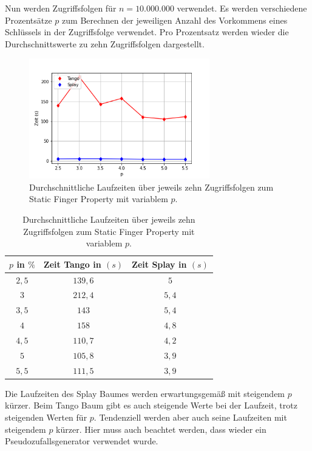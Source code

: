 \documentclass[a4paper,12pt]{article}
\begin{document}
\noindent Nun werden Zugriffsfolgen für $n = 10.000.000$ verwendet. Es werden verschiedene Prozentsätze $p$ zum Berechnen der jeweiligen Anzahl des Vorkommens eines Schlüssels in der Zugriffsfolge verwendet. Pro Prozentsatz werden wieder die Durchschnittswerte zu zehn Zugriffsfolgen dargestellt. 
\begin{figure}[H]
	\centering
	\includegraphics[width=0.7\textwidth]{Medien/laufzeittest/diagramm/staticfinger4}
	\caption{Durchschnittliche Laufzeiten über jeweils zehn Zugriffsfolgen zum Static Finger Property mit variablem $p$.}
\end{figure}
\begin{table}[H]
	\begin{center}
		\begin{tabular}[c]{|c|c|c|}
			\hline
			$p$ in $\%$ & Zeit Tango in $\left(s\right)$ &Zeit Splay in $\left(s\right)$ \\
			\hline
			$2,5$  & $139,6$ &$5$  \\
			\hline
			$3$  &   $212,4$ &  $5,4$  \\
			\hline
			$3,5$  & $143$ &$5,4$  \\
			\hline
			$4$ &    $158$ &$4,8$ \\
			\hline
			$4,5$  & $110,7$ &$4,2$  \\
			\hline
			$5$  &   $105,8$ &  $3,9$  \\
			\hline
			$5,5$  & $111,5$ &$3,9$  \\
			\hline
		\end{tabular}
		\caption{Durchschnittliche Laufzeiten über jeweils zehn Zugriffsfolgen zum Static Finger Property mit variablem $p$.} 
	\end{center}
\end{table}

\noindent Die Laufzeiten des Splay Baumes werden erwartungsgemäß mit steigendem $p$ kürzer. Beim Tango Baum gibt es auch steigende Werte bei der Laufzeit, trotz steigenden Werten für $p$. Tendenziell werden aber auch seine Laufzeiten mit steigendem $p$ kürzer. Hier muss auch beachtet werden, dass wieder ein Pseudozufallsgenerator verwendet wurde.
\end{document}
